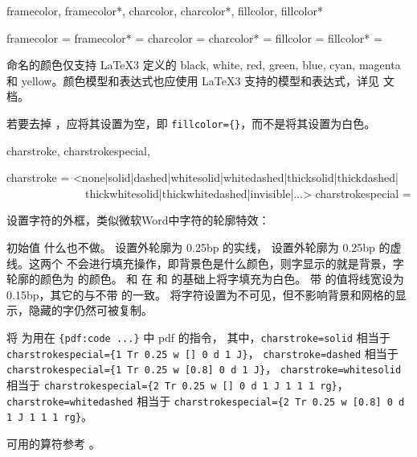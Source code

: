 \documentclass{ctxdoc}
\begin{document}
\begin{function}{
  framecolor,
  framecolor*,
  charcolor,
  charcolor*,
  fillcolor,
  fillcolor*
}
  \begin{syntax}
    framecolor  =  
    framecolor* =  
    charcolor   =  
    charcolor*  =  
    fillcolor   = 
    fillcolor*  =  
  \end{syntax}
  命名的颜色仅支持 \LaTeX3 定义的 black, white, red, green, blue, cyan, magenta 和 yellow。颜色模型和表达式也应使用 \LaTeX3 支持的模型和表达式，详见 \cite{pdf-interface3} 文档。

  若要去掉 ，应将其设置为空，即 \verb|fillcolor={}|，而不是将其设置为白色。
\end{function}

\begin{function}{
  charstroke,
  charstrokespecial,
  \zitiestrokechars
}
  \begin{syntax}
    charstroke = <none|solid|dashed|whitesolid|whitedashed|thicksolid|thickdashed|
    ~~~~~~~~~~~~~~thickwhitesolid|thickwhitedashed|invisible|...> 
    charstrokespecial = 
      
  \end{syntax}
  设置字符的外框，类似微软Word中字符的轮廓特效：

  初始值  什么也不做。 设置外轮廓为 0.25bp 的实线， 设置外轮廓为 0.25bp 的虚线。这两个
  不会进行填充操作，即背景色是什么颜色，则字显示的就是背景，字轮廓的颜色为  的颜色。 和
   在  和  的基础上将字填充为白色。
  带  的值将线宽设为 0.15bp，其它的与不带  的一致。 将字符设置为不可见，但不影响背景和网格的显示，隐藏的字仍然可被复制。

   将  为用在 \verb|{pdf:code ...}| 中 pdf 的指令，
  其中，\verb|charstroke=solid| 相当于 \verb|charstrokespecial={1 Tr 0.25 w [] 0 d 1 J}|，
  \verb|charstroke=dashed| 相当于 \verb|charstrokespecial={1 Tr 0.25 w [0.8] 0 d 1 J}|，
  \verb|charstroke=whitesolid| 相当于 \verb|charstrokespecial={2 Tr 0.25 w [] 0 d 1 J 1 1 1 rg}|，
  \verb|charstroke=whitedashed| 相当于 \verb|charstrokespecial={2 Tr 0.25 w [0.8] 0 d 1 J 1 1 1 rg}|。
  
   可用的算符参考 \cite{pdfreference}。
\end{function}
  
\end{document}
